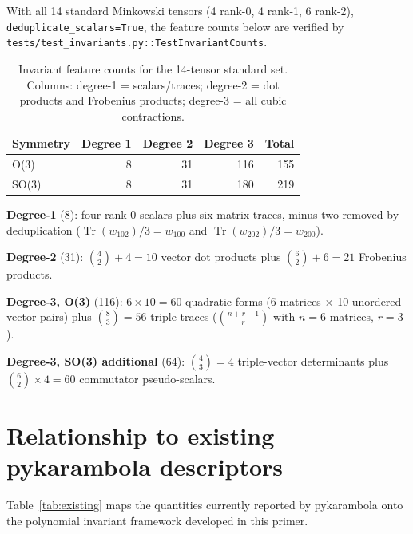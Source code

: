 \documentclass[11pt,a4paper]{article}
\begin{document}
With all 14 standard Minkowski tensors (4 rank-0, 4 rank-1, 6 rank-2),
\texttt{deduplicate\_scalars=True}, the feature counts below are verified by
\texttt{tests/test\_invariants.py::TestInvariantCounts}.

\begin{table}[h]
\centering
\caption{Invariant feature counts for the 14-tensor standard set.
         Columns: degree-1 = scalars/traces; degree-2 = dot products and Frobenius
         products; degree-3 = all cubic contractions.}
\label{tab:counts}
\begin{tabular}{lrrrr}
\toprule
Symmetry & Degree 1 & Degree 2 & Degree 3 & Total \\
\midrule
O(3)  & 8 & 31 & 116 & 155 \\
SO(3) & 8 & 31 & 180 & 219 \\
\bottomrule
\end{tabular}
\end{table}

\noindent
\textbf{Degree-1} (8): four rank-0 scalars plus six matrix traces, minus two
removed by deduplication ($\operatorname{Tr}(w_{102})/3 = w_{100}$ and
$\operatorname{Tr}(w_{202})/3 = w_{200}$).

\textbf{Degree-2} (31): $\binom{4}{2}+4 = 10$ vector dot products plus
$\binom{6}{2}+6 = 21$ Frobenius products.

\textbf{Degree-3, O(3)} (116): $6 \times 10 = 60$ quadratic forms (6 matrices
$\times$ 10 unordered vector pairs) plus $\binom{8}{3} = 56$ triple traces
($\binom{n+r-1}{r}$ with $n=6$ matrices, $r=3$).

\textbf{Degree-3, SO(3) additional} (64): $\binom{4}{3} = 4$ triple-vector
determinants plus $\binom{6}{2} \times 4 = 60$ commutator pseudo-scalars.

\section{Relationship to existing pykarambola descriptors}
\label{sec:existing}

Table~\ref{tab:existing} maps the quantities currently reported by pykarambola
onto the polynomial invariant framework developed in this primer.
\end{document}
